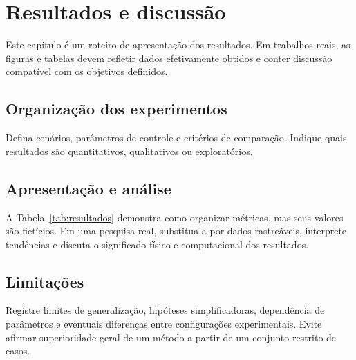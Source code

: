 \chapter{Resultados e discussão}\label{chap:resultados}
Este capítulo é um roteiro de apresentação dos resultados. Em trabalhos reais, as figuras e tabelas devem refletir dados efetivamente obtidos e conter discussão compatível com os objetivos definidos.

\section{Organização dos experimentos}
Defina cenários, parâmetros de controle e critérios de comparação. Indique quais resultados são quantitativos, qualitativos ou exploratórios.

\section{Apresentação e análise}
A Tabela~\ref{tab:resultados} demonstra como organizar métricas, mas seus valores são fictícios. Em uma pesquisa real, substitua-a por dados rastreáveis, interprete tendências e discuta o significado físico e computacional dos resultados.

\section{Limitações}
Registre limites de generalização, hipóteses simplificadoras, dependência de parâmetros e eventuais diferenças entre configurações experimentais. Evite afirmar superioridade geral de um método a partir de um conjunto restrito de casos.
